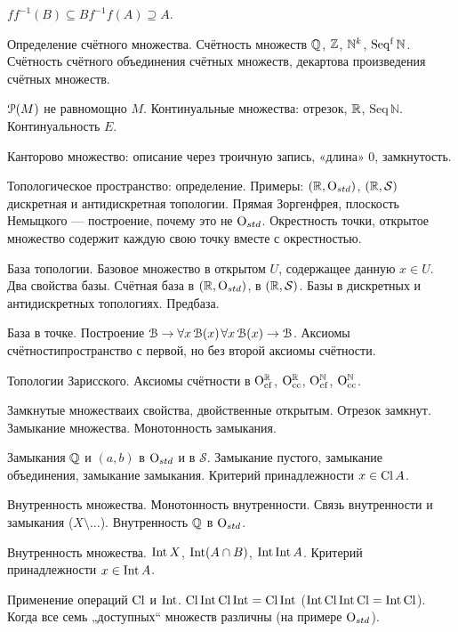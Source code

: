 \documentclass[a4paper,11pt]{extarticle}
\begin{document}
\begin{enumerate}

\itm $ff^{-1} (B) \subseteq B$\scolon $f^{-1}f (A) \supseteq A$.

\itm Определение счётного множества. Счётность множеств $\mathbb Q$, $\mathbb Z$, $\mathbb N^k$, $\mathrm{Seq^f}\,\mathbb N$. Счётность счётного объединения счётных множеств, декартова произведения счётных множеств.

\itm $\EuScript P(M)$ не равномощно $M$. Континуальные множества: отрезок, $\mathbb R$, $\mathrm{Seq}\,\mathbb N$. Континуальность $E$.

\itm Канторово множество: описание через троичную запись, «длина» 0, замкнутость.

\itm Топологическое пространство: определение. Примеры: $(\mathbb R, \mathrm O_{std})$, $(\mathbb R, \mathcal S)$\scolon дискретная и антидискретная топологии. Прямая Зоргенфрея, плоскость Немыцкого — построение, почему это не $\mathrm O_{std}$. Окрестность точки, открытое множество содержит каждую свою точку вместе с окрестностью.

\itm База топологии. Базовое множество в открытом $U$, содержащее данную $x \in U$. Два свойства базы. Счётная база в $(\mathbb R, \mathrm O_{std})$, в $(\mathbb R, \mathcal S)$. Базы в дискретных и антидискретных топологиях. Предбаза.

\itm База в точке. Построение $\EuScript B \rightarrow \forall x\,\EuScript B(x)$\scolon $\forall x\,\EuScript B(x) \rightarrow \EuScript B$. Аксиомы счётности\scolon пространство с первой, но без второй аксиомы счётности.

\itm Топологии Зарисского. Аксиомы счётности в $\mathrm O^{\mathbb R}_{\mathrm{cf}}$, $\mathrm O^{\mathbb R}_{\mathrm{cc}}$, $\mathrm O^{\mathbb N}_{\mathrm{cf}}$, $\mathrm O^{\mathbb N}_{\mathrm{cc}}$.

\itm Замкнутые множества\scolon их свойства, двойственные открытым. Отрезок замкнут. Замыкание множества. Монотонность замыкания.

\itm Замыкания $\mathbb Q$ и $(a,b)$ в $\mathrm O_{std}$ и в $\mathcal S$. Замыкание пустого, замыкание объединения, замыкание замыкания. Критерий принадлежности $x \in \operatorname{Cl} A$.

\itm Внутренность множества. Монотонность внутренности. Связь внутренности и замыкания ($X \setminus \ldots$). Внутренность $\mathbb Q$ в $\mathrm O_{std}$.

\itm Внутренность множества. $\operatorname{Int} X$, $\operatorname{Int} (A \cap B)$, $\operatorname{Int} \operatorname{Int} A$. Критерий принадлежности $x \in \operatorname{Int} A$.

\itm Применение операций $\operatorname{Cl}$ и $\operatorname{Int}$. $\operatorname{Cl} \operatorname{Int} \operatorname{Cl} \operatorname{Int} = \operatorname{Cl} \operatorname{Int}$ ($\operatorname{Int} \operatorname{Cl} \operatorname{Int} \operatorname{Cl} = \operatorname{Int} \operatorname{Cl}$). Когда все семь „доступных“ множеств различны (на примере $\mathrm O_{std}$).


\end{enumerate}
\end{document}
